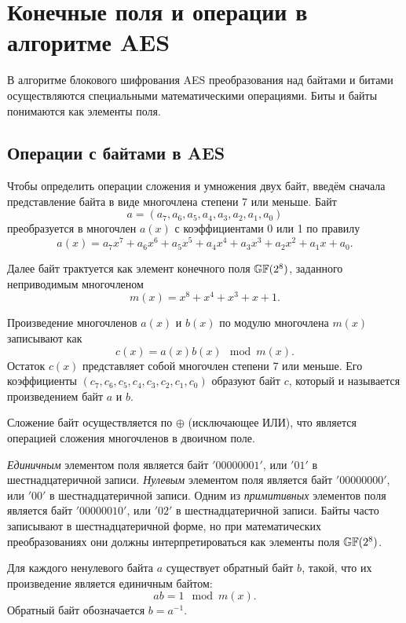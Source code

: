 \section{Конечные поля и операции в алгоритме AES}

В алгоритме блокового шифрования AES преобразования над байтами и битами осуществляются специальными математическими операциями. Биты и байты понимаются как элементы поля.

\subsection{Операции с байтами в AES}

Чтобы определить операции сложения и умножения двух байт, введём сначала представление байта в виде многочлена степени 7 или меньше. Байт
    \[ a =( a_7, a_6, a_5, a_4, a_3, a_2, a_1, a_0) \]
преобразуется в многочлен $a(x)$ с коэффициентами 0 или 1 по правилу
    \[ a(x) = a_{7}x^{7}+a_{6}x^{6}+a_{5}x^{5}+a_{4}x^{4}+a_{3}x^{3}+a_{2}x^{2}+a_{1}x+a_{0}. \]

Далее байт трактуется как элемент конечного поля $\mathbb{GF}(2^8)$, заданного неприводимым многочленом
    \[ m(x) = x^{8}+x^{4}+x^{3}+x +1. \]

Произведение многочленов $a(x)$ и $b(x)$ по модулю многочлена $m(x)$ записывают как
    \[ c(x) = a(x) b(x) \mod m(x). \]
Остаток $c(x)$ представляет собой многочлен степени 7 или меньше. Его коэффициенты $(c_{7}, c_{6}, c_{5}, c_{4}, c_{3}, c_{2}, c_{1}, c_{0})$ образуют байт $c$, который и называется произведением байт $a$ и $b$.

Сложение байт осуществляется по $\oplus$ (исключающее ИЛИ), что является операцией сложения многочленов в двоичном поле.

\emph{Единичным} элементом поля является байт $\mathrm{'00000001'}$, или $\mathrm{'01'}$ в шестнадцатеричной записи. \emph{Нулевым} элементом поля является байт $\mathrm{'00000000'}$, или $\mathrm{'00'}$ в шестнадцатеричной записи. Одним из \emph{примитивных} элементов поля является байт $\mathrm{'00000010'}$, или $\mathrm{'02'}$ в шестнадцатеричной записи. Байты часто записывают в шестнадцатеричной форме, но при математических преобразованиях они должны интерпретироваться как элементы поля $\mathbb{GF}(2^8)$.

Для каждого ненулевого байта $a$ существует обратный байт $b$, такой, что их произведение является единичным байтом:
    \[ a b = 1 \mod m(x). \]
Обратный байт обозначается $b = a^{-1}$.

